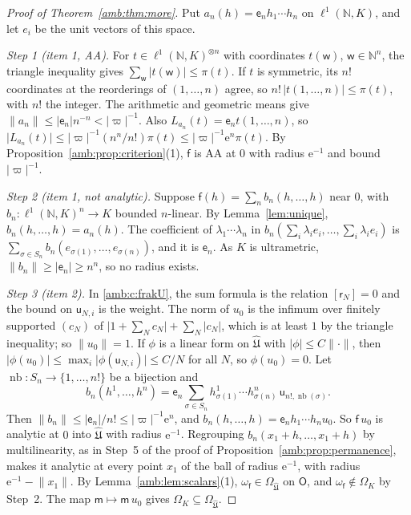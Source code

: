 \documentclass[11pt]{amsart}
\theoremstyle{definition}
\theoremstyle{remark}
\numberwithin{equation}{section}
\newcommand{\N}{\mathbb N}
\newcommand{\abs}[1]{\lvert #1\rvert}
\newcommand{\norm}[1]{\lVert #1\rVert}
\theoremstyle{plain}
\theoremstyle{definition}
\theoremstyle{plain}
\begin{document}
\begin{proof}[Proof of Theorem~\ref{amb:thm:more}]
Put $a_n(h)=\mathsf e_nh_1\cdots h_n$ on $\ell^1(\N,K)$, and let $e_i$ be the unit vectors of this space.

\emph{Step 1 (item 1, AA).} For $t\in\ell^1(\N,K)^{\otimes n}$ with coordinates $t(\mathsf w)$, $\mathsf w\in\N^n$, the triangle inequality gives $\sum_{\mathsf w}\abs{t(\mathsf w)}\le\pi(t)$. If $t$ is symmetric, its $n!$ coordinates at the reorderings of $(1,\dots,n)$ agree, so $n!\,\abs{t(1,\dots,n)}\le\pi(t)$, with $n!$ the integer. The arithmetic and geometric means give $\norm{a_n}\le\abs{\mathsf e_n}n^{-n}<\abs\varpi^{-1}$. Also $L_{a_n}(t)=\mathsf e_nt(1,\dots,n)$, so $\abs{L_{a_n}(t)}\le\abs\varpi^{-1}(n^n/n!)\pi(t)\le\abs\varpi^{-1}\mathrm e^n\pi(t)$. By Proposition~\ref{amb:prop:criterion}(1), $\mathsf f$ is AA at $0$ with radius $\mathrm e^{-1}$ and bound $\abs\varpi^{-1}$.

\emph{Step 2 (item 1, not analytic).} Suppose $\mathsf f(h)=\sum_nb_n(h,\dots,h)$ near $0$, with $b_n\colon\ell^1(\N,K)^n\to K$ bounded $n$-linear. By Lemma~\ref{lem:unique}, $b_n(h,\dots,h)=a_n(h)$. The coefficient of $\lambda_1\cdots\lambda_n$ in $b_n(\sum_i\lambda_ie_i,\dots,\sum_i\lambda_ie_i)$ is $\sum_{\sigma\in S_n}b_n(e_{\sigma(1)},\dots,e_{\sigma(n)})$, and it is $\mathsf e_n$. As $K$ is ultrametric, $\norm{b_n}\ge\abs{\mathsf e_n}\ge n^n$, so no radius exists.

\emph{Step 3 (item 2).} In \eqref{amb:c:frakU}, the sum formula is the relation $[\mathsf r_N]=0$ and the bound on $\mathsf u_{N,i}$ is the weight. The norm of $u_0$ is the infimum over finitely supported $(c_N)$ of $\abs{1+\sum_Nc_N}+\sum_N\abs{c_N}$, which is at least $1$ by the triangle inequality; so $\norm{u_0}=1$. If $\phi$ is a linear form on $\widehat{\mathfrak U}$ with $\abs\phi\le C\norm\cdot$, then $\abs{\phi(u_0)}\le\max_i\abs{\phi(\mathsf u_{N,i})}\le C/N$ for all $N$, so $\phi(u_0)=0$. Let $\operatorname{nb}\colon S_n\to\{1,\dots,n!\}$ be a bijection and
\[
 b_n(h^1,\dots,h^n)=\mathsf e_n\sum_{\sigma\in S_n}h^1_{\sigma(1)}\cdots h^n_{\sigma(n)}\,\mathsf u_{n!,\operatorname{nb}(\sigma)} .
\]
Then $\norm{b_n}\le\abs{\mathsf e_n}/n!\le\abs\varpi^{-1}\mathrm e^n$, and $b_n(h,\dots,h)=\mathsf e_nh_1\cdots h_nu_0$. So $\mathsf f\,u_0$ is analytic at $0$ into $\widehat{\mathfrak U}$ with radius $\mathrm e^{-1}$. Regrouping $b_n(x_1+h,\dots,x_1+h)$ by multilinearity, as in Step~5 of the proof of Proposition~\ref{amb:prop:permanence}, makes it analytic at every point $x_1$ of the ball of radius $\mathrm e^{-1}$, with radius $\mathrm e^{-1}-\norm{x_1}$. By Lemma~\ref{amb:lem:scalars}(1), $\omega_{\mathsf f}\in\Omega_{\widehat{\mathfrak U}}$ on $\mathsf O$, and $\omega_{\mathsf f}\notin\Omega_K$ by Step~2. The map $\mathsf m\mapsto\mathsf m\,u_0$ gives $\Omega_K\subseteq\Omega_{\widehat{\mathfrak U}}$.


\end{proof}
\end{document}
